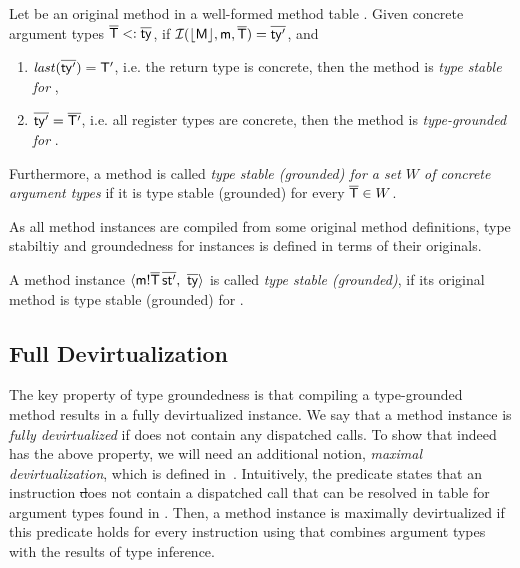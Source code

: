 \begin{definition}\label{def:ground}
  Let \meth{\m}{\ol\ty}{}{\ol\st} be an original method in a well-formed
  method table \mtbl. Given concrete argument types $\overline{\mathsf{T}} <: \overline{\mathsf{ty}}$,
  if $\operatorname{\mathcal{I}}(\lfloor \mathsf{M} \rfloor, \mathsf{m}, \overline{\mathsf{T}}) = \overline{\mathsf{ty}'}$,
  and
  \begin{enumerate}
  \item  $\mathit{last}(\overline{\mathsf{ty}'}) = \mathsf{T}'$, i.e. the return type is concrete, then
    the method is \emph{type stable for \ol\Ty},
  \item $\overline{\mathsf{ty}'} = \overline{\mathsf{T}'}$, i.e. all register types are concrete, then the
    method is \emph{type-grounded for \ol\Ty}.
  \end{enumerate}

  Furthermore, a method is called \emph{type stable (grounded) for a set $W$
  of concrete argument types} if it is type stable (grounded) for every
  $\overline{\mathsf{T}} \in W$.
\end{definition}

As all method instances are compiled from some original method definitions,
type stabiltiy and groundedness for instances is defined in terms of their
originals.

\begin{definition}\label{def:ground-inst}
  A method instance $\langle \mathsf{m}!{\overline{\mathsf{T}}}\,{\overline{\mathsf{st}'}},\ \overline{\mathsf{ty}} \rangle$
  is called \emph{type stable (grounded)},
  if its original method \msig\m{\ol\ty} is type stable (grounded) for \ol\Ty.
\end{definition}


\subsection{Full Devirtualization}\label{sec:ground-inst-prop}

The key property of type groundedness is that
compiling a type-grounded method results in a fully devirtualized instance.
We say that a method instance \meth{}\ol{\st} is \emph{fully devirtualized}
if \ol{\st} does not contain any dispatched calls. To show that \jit
indeed has the above property, we will need an additional
notion, \emph{maximal devirtualization}, which is defined
in~. Intuitively, the predicate \devirtst{\ol\ty}{\mtbl}{\st}
states that an instruction \st does not contain a dispatched call
that can be resolved in table \mtbl for argument types found in \ol\ty.
Then, a method instance is maximally devirtualized if this predicate
holds for every instruction using \ol\ty that combines argument types with
the results of type inference.

